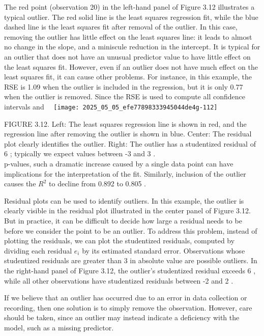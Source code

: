 \documentclass[10pt]{article}
\begin{document}
The red point (observation 20) in the left-hand panel of Figure 3.12 illustrates a typical outlier. The red solid line is the least squares regression fit, while the blue dashed line is the least squares fit after removal of the outlier. In this case, removing the outlier has little effect on the least squares line: it leads to almost no change in the slope, and a miniscule reduction in the intercept. It is typical for an outlier that does not have an unusual predictor value to have little effect on the least squares fit. However, even if an outlier does not have much effect on the least squares fit, it can cause other problems. For instance, in this example, the RSE is 1.09 when the outlier is included in the regression, but it is only 0.77 when the outlier is removed. Since the RSE is used to compute all confidence intervals and\
\
\texttt{[image: 2025\_05\_05\_efe77898333945044de4g-112]}

FIGURE 3.12. Left: The least squares regression line is shown in red, and the regression line after removing the outlier is shown in blue. Center: The residual plot clearly identifies the outlier. Right: The outlier has a studentized residual of 6 ; typically we expect values between -3 and 3 .\\
p-values, such a dramatic increase caused by a single data point can have implications for the interpretation of the fit. Similarly, inclusion of the outlier causes the $R^{2}$ to decline from 0.892 to 0.805 .

Residual plots can be used to identify outliers. In this example, the outlier is clearly visible in the residual plot illustrated in the center panel of Figure 3.12. But in practice, it can be difficult to decide how large a residual needs to be before we consider the point to be an outlier. To address this problem, instead of plotting the residuals, we can plot the studentized residuals, computed by dividing each residual $e_{i}$ by its estimated standard error. Observations whose studentized residuals are greater than 3 in absolute value are possible outliers. In the right-hand panel of Figure 3.12, the outlier's studentized residual exceeds 6 , while all other observations have studentized residuals between -2 and 2 .

If we believe that an outlier has occurred due to an error in data collection or recording, then one solution is to simply remove the observation. However, care should be taken, since an outlier may instead indicate a deficiency with the model, such as a missing predictor.
\end{document}
